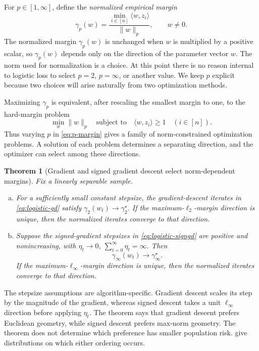 \documentclass[11pt,twoside]{article}
\newtheorem{theorem}{Theorem}[section]
\theoremstyle{definition}
\theoremstyle{remark}
\begin{document}
For $p\in[1,\infty]$, define the \emph{normalized empirical margin}
\[
 \gamma_p(w)=\frac{\min_{i\in[n]}\langle w,z_i\rangle}{\|w\|_p},
 \qquad w\ne0.
\]
The normalized margin $\gamma_p(w)$ is unchanged when $w$ is multiplied by a
positive scalar, so $\gamma_p(w)$ depends only on the direction of the
parameter vector $w$.
The norm used for normalization is a choice. At this point there is no reason
internal to logistic loss to select
$p=2$, $p=\infty$, or another value. We keep $p$ explicit because two choices
will arise naturally from two optimization methods.

Maximizing $\gamma_p$ is equivalent, after rescaling the smallest margin to
one, to the hard-margin problem
\begin{equation}
 \min_w\|w\|_p
 \quad\text{subject to}\quad
 \langle w,z_i\rangle\ge1\quad(i\in[n]).
 \label{eq:p-margin}
\end{equation}
Thus varying $p$ in \cref{eq:p-margin} gives a family of norm-constrained
optimization problems. A solution of each problem determines a separating
direction, and the optimizer can select among these directions.

\begin{theorem}[Gradient and signed gradient descent select norm-dependent margins]
\label{thm:discrete-margin-selection}
Fix a linearly separable sample.
\begin{enumerate}[(a),leftmargin=*]
\item For a sufficiently small constant stepsize, the gradient-descent
iterates in \cref{eq:logistic-gd} satisfy
$\gamma_2(w_t)\longrightarrow\gamma_2^\star$.
If the maximum-$\ell_2$-margin direction is unique, then the normalized
iterates converge to that direction.
\item Suppose the signed-gradient stepsizes in
\cref{eq:logistic-signgd} are positive and nonincreasing, with
 $\eta_t\longrightarrow0$,
 $
 \sum_{t=0}^\infty\eta_t=\infty$.
Then
\[
 \gamma_\infty(w_t)\longrightarrow\gamma_\infty^\star.
\]
If the maximum-$\ell_\infty$-margin direction is unique, then the normalized
iterates converge to that direction.
\end{enumerate}
\end{theorem}

The stepsize assumptions are algorithm-specific. Gradient descent scales its
step by the magnitude of the gradient, whereas signed descent takes a unit
$\ell_\infty$ direction before applying $\eta_t$. The theorem says that
gradient descent prefers Euclidean geometry, while signed descent prefers
max-norm geometry. The theorem does not determine which preference has
smaller population risk.  give
distributions on
which either ordering occurs.
\end{document}

